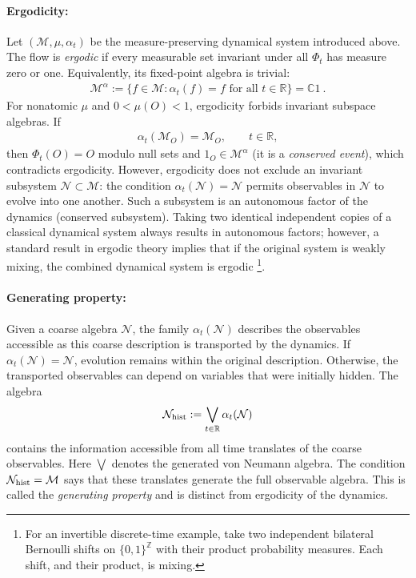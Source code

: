 \documentclass[a4paper,11pt]{article}
\theoremstyle{definition}
\newcommand{\mN}{\mathcal{N}}
\newcommand{\mM}{\mathcal{M}}
\begin{document}
\paragraph{Ergodicity:}
Let $(\mM,\mu,\alpha_t)$ be the measure-preserving dynamical system introduced above. The flow is {\it ergodic} if every measurable set invariant under all $\Phi_t$ has measure zero or one. Equivalently, its fixed-point algebra is trivial:
\begin{align}
    \mM^\alpha
    :=\{f\in\mM:\alpha_t(f)=f\text{ for all }t\in\mathbb R\}
    =\mathbb C1\ .
\end{align}
For nonatomic $\mu$ and $0<\mu(O)<1$, ergodicity forbids invariant subspace algebras. If
\begin{align}
    \alpha_t(\mM_O)=\mM_O,\qquad t\in\mathbb R,
\end{align}
then $\Phi_t(O)=O$ modulo null sets and $1_O\in\mM^\alpha$ (it is a {\it conserved event}), which contradicts ergodicity. However, ergodicity does not exclude an invariant subsystem $\mN\subset\mM$: the condition $\alpha_t(\mN)=\mN$ permits observables in $\mN$ to evolve into one another. Such a subsystem is an autonomous factor of the dynamics (conserved subsystem). Taking two identical independent copies of a classical dynamical system always results in autonomous factors; however, a standard result in ergodic theory implies that if the original system is weakly mixing, the combined dynamical system is ergodic \footnote{For an invertible discrete-time example, take two independent bilateral Bernoulli shifts on $\{0,1\}^{\mathbb Z}$ with their product probability measures. Each shift, and their product, is mixing.}.

\paragraph{Generating property:}
Given a coarse algebra $\mN$, the family $\alpha_t(\mN)$ describes the observables accessible as this coarse description is transported by the dynamics. If $\alpha_t(\mN)=\mN$, evolution remains within the original description. Otherwise, the transported observables can depend on variables that were initially hidden. The algebra
\begin{align}
    \mN_{\rm hist}:=\bigvee_{t\in\mathbb R}\alpha_t(\mN)
\end{align}
contains the information accessible from all time translates of the coarse observables. Here $\bigvee$ denotes the generated von Neumann algebra. The condition $\mN_{\rm hist}=\mM$ says that these translates generate the full observable algebra. This is called the {\it generating property} and is distinct from ergodicity of the dynamics.
\end{document}
